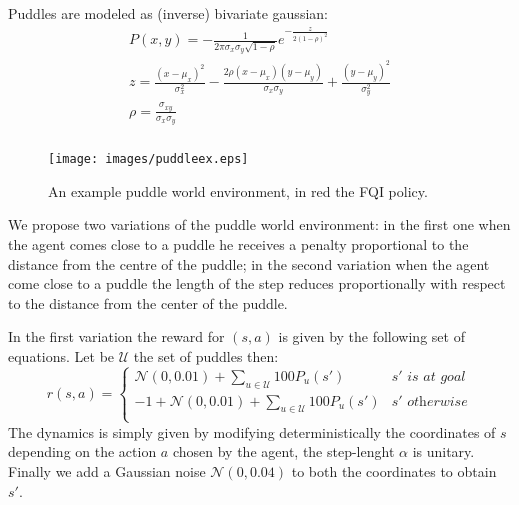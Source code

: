     \noindent Puddles are modeled as (inverse) bivariate gaussian:
    \begin{equation}
      \begin{multlined}
        P(x,y) = - \frac{1}{2 \pi \sigma_x \sigma_y \sqrt{1 - \rho}} e^{-\frac{z}{2(1-\rho)^{2}}} \\
        z = \frac{(x - \mu_x )^2}{\sigma_x^2} - \frac{2 \rho (x-\mu_x)(y-\mu_y)}{\sigma_x \sigma_y} + \frac{(y - \mu_y )^2}{\sigma_y^2} \\
        \rho = \frac{\sigma_{xy}}{\sigma_x \sigma_y} \\
      \end{multlined}
    \end{equation}

    \begin{figure}[H]
      \centering
      \texttt{[image: images/puddleex.eps]}
      \caption{An example puddle world environment, in red the FQI policy.}
      \label{puddleex}
    \end{figure}

    \noindent We propose two variations of the puddle world environment: in the first one when the agent comes close to a puddle he
    receives a penalty proportional to the distance from the centre of the puddle; in the second variation when the agent come close
    to a puddle the length of the step reduces proportionally with respect to the distance from the center of the puddle.\newline

    \noindent In the first variation the reward for $(s,a)$ is given by the following set of equations. Let be $\mathcal{U}$ the set of puddles then:
    \begin{equation}
      r(s,a) =
      \begin{cases}
        \mathcal{N}(0,0.01) + \sum_{u \in \mathcal{U}} 100 P_{u}(s') & s' \textit{ is at goal} \\
        -1 + \mathcal{N}(0,0.01) + \sum_{u \in \mathcal{U}} 100 P_{u}(s') & s' \textit{ otherwise} \\
      \end{cases}
      \label{rw-puddle}
    \end{equation}
    The dynamics is simply given by modifying deterministically the coordinates of $s$ depending on the action $a$ chosen by
    the agent, the step-lenght $\alpha$ is unitary. Finally we add a Gaussian noise $\mathcal{N}(0,0.04)$ to both the coordinates
    to obtain $s'$.\newline

